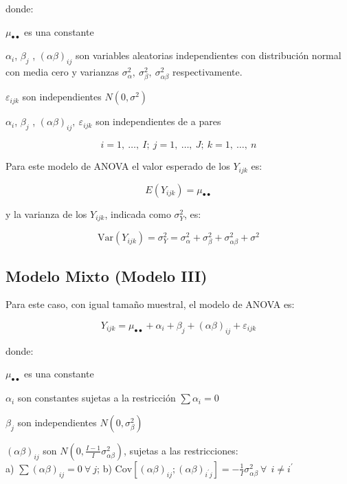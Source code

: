\documentclass[]{book}
\theoremstyle{definition}
\theoremstyle{definition}
\theoremstyle{definition}
\theoremstyle{remark}
\begin{document}
donde:

\(\mu_{\bullet \bullet}\) es una constante

\(\alpha_{i}\), \(\beta_{j}\) , \(\left( \alpha\beta \right)_{ij}\) son
variables aleatorias independientes con distribución normal con media
cero y varianzas
\(\sigma_{\alpha}^{2},\ \sigma_{\beta}^{2},\ \sigma_{\alpha\beta}^{2}\)
respectivamente.

\(\varepsilon_{ijk}\) son independientes \(N(0,\sigma^{2})\)

\(\alpha_{i}\), \(\beta_{j}\) , \(\left( \alpha\beta \right)_{ij},\
\varepsilon_{ijk}\) son independientes de a pares

\[
i = 1,\ \ldots,\ I;\ j = 1,\ \ldots,\ J;\ k = 1,\ \ldots,\ n
\]

Para este modelo de ANOVA el valor esperado de los \(Y_{ijk}\) es:

\[
E\left( Y_{ijk} \right) = \mu_{\bullet \bullet}
\]

y la varianza de los \(Y_{ijk}\), indicada como \(\sigma_{Y}^{2}\), es:

\[
\text{Var}\left( Y_{ijk} \right) = \sigma_{Y}^{2} = \sigma_{\alpha}^{2} + \sigma_{\beta}^{2} + \sigma_{\alpha\beta}^{2} + \sigma^{2}
\]

\hypertarget{modelo-mixto-modelo-iii}{%
\subsection{Modelo Mixto (Modelo III)}\label{modelo-mixto-modelo-iii}}

Para este caso, con igual tamaño muestral, el modelo de ANOVA es:

\[
Y_{ijk} = \mu_{\bullet \bullet} + \alpha_{i} + \beta_{j} + \left( \alpha\beta \right)_{ij} + \varepsilon_{ijk}
\]

donde:

\(\mu_{\bullet \bullet}\) es una constante

\(\alpha_{i}\) son constantes sujetas a la restricción
\(\sum\alpha_{i} = 0\)

\(\beta_{j}\) son independientes \(N(0,\sigma_{\beta}^{2})\)

\(\left( \alpha\beta \right)_{ij}\) son
\(N\left( 0,\frac{I - 1}{I}\sigma_{\alpha\beta}^{2} \right)\), sujetas a
las restricciones:\\
a) \(\sum\left( \alpha\beta \right)_{ij} = 0\ \forall\ j\); b)
\(\text{Cov}\left\lbrack \left( \alpha\beta \right)_{ij};\left( \alpha\beta \right)_{i^{'}j} \right\rbrack = - \frac{1}{I}\sigma_{\alpha\beta}^{2}\ \forall\ \
i \neq i^{'}\)
\end{document}
